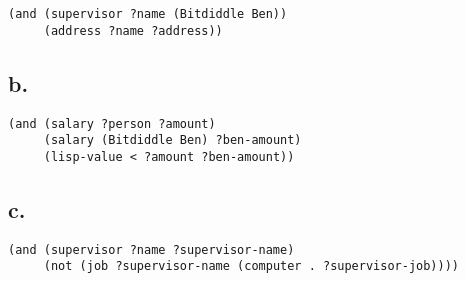 \documentclass[../main.tex]{subfiles}
\begin{document}
\begin{lstlisting}
(and (supervisor ?name (Bitdiddle Ben))
     (address ?name ?address))
\end{lstlisting}

\subsection{b.}

\begin{lstlisting}
(and (salary ?person ?amount)
     (salary (Bitdiddle Ben) ?ben-amount)
     (lisp-value < ?amount ?ben-amount))
\end{lstlisting}

\subsection{c.}

\begin{lstlisting}
(and (supervisor ?name ?supervisor-name)
     (not (job ?supervisor-name (computer . ?supervisor-job))))
\end{lstlisting}
\end{document}
